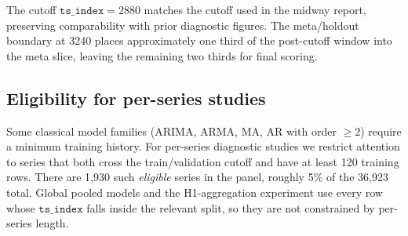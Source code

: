 The cutoff $\mathtt{ts\_index} = 2880$ matches the cutoff used in the midway report, preserving comparability with prior diagnostic figures. The meta/holdout boundary at 3240 places approximately one third of the post-cutoff window into the meta slice, leaving the remaining two thirds for final scoring.

\subsection{Eligibility for per-series studies}

Some classical model families (ARIMA, ARMA, MA, AR with order $\geq 2$) require a minimum training history. For per-series diagnostic studies we restrict attention to series that both cross the train/validation cutoff and have at least 120 training rows. There are 1{,}930 such \emph{eligible} series in the panel, roughly 5\% of the 36{,}923 total. Global pooled models and the H1-aggregation experiment use every row whose $\mathtt{ts\_index}$ falls inside the relevant split, so they are not constrained by per-series length.
